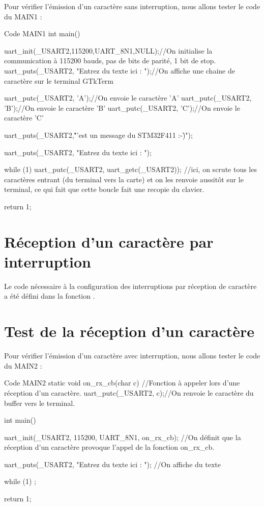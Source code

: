 Pour vérifier l'émission d'un caractère sans interruption, nous allons tester le code du MAIN1 : 

\begin{Cpp}{Code MAIN1}
int main()
{
	uart_init(_USART2,115200,UART_8N1,NULL);//On initialise la communication à 115200 bauds, pas de bits de parité, 1 bit de stop.
	uart_puts(_USART2, "Entrez du texte ici : ");//On affiche une chaine de caractère sur le terminal GTkTerm

	uart_putc(_USART2, 'A');//On envoie le caractère 'A'
	uart_putc(_USART2, 'B');//On envoie le caractère 'B'
	uart_putc(_USART2, 'C');//On envoie le caractère 'C'
	
	uart_puts(_USART2,"\r\nC'est un message du STM32F411 :-)\r\n");

	uart_puts(_USART2, "Entrez du texte ici : ");

	while (1) {
		uart_putc(_USART2, uart_getc(_USART2));
	}
	//ici, on scrute tous les caractères entrant (du terminal vers la carte) et on les renvoie aussitôt sur le terminal, ce qui fait que cette boucle fait une recopie du clavier.

	return 1;
}
\end{Cpp}


\section{Réception d'un caractère par interruption}

Le code nécessaire à la configuration des interruptions par réception de caractère a été défini dans la fonction .

\section{Test de la réception d'un caractère}


Pour vérifier l'émission d'un caractère avec interruption, nous allons tester le code du MAIN2 : 

\begin{Cpp}{Code MAIN2}
static void on_rx_cb(char c) //Fonction à appeler lors d'une réception d'un caractère.
{
	uart_putc(_USART2, c);//On renvoie le caractère du buffer vers le terminal.
}

int main()
{
	uart_init(_USART2, 115200, UART_8N1, on_rx_cb);
	//On définit que la réception d'un caractère provoque l'appel de la fonction on_rx_cb.

	uart_puts(_USART2, "Entrez du texte ici : "); //On affiche du texte

	while (1) ;

	return 1;
}
\end{Cpp}

